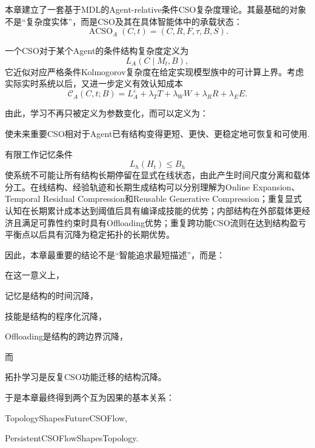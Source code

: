 本章建立了一套基于MDL的Agent-relative条件CSO复杂度理论。其最基础的对象不是“复杂度实体”，而是CSO及其在具体智能体中的承载状态：
\[
\operatorname{ACSO}_{A}(C,t)
=
(C,R,F,\tau,B,S).
\]

一个CSO对于某个Agent的条件结构复杂度定义为
\[
L_A(C\mid M_t,B),
\]
它近似对应严格条件Kolmogorov复杂度在给定实现模型族中的可计算上界。考虑实际实时系统以后，又进一步定义有效认知成本
\[
\mathscr C_A(C,t;B)
=
L_A^\varepsilon
+
\lambda_TT
+
\lambda_WW
+
\lambda_RR
+
\lambda_EE.
\]

由此，学习不再只被定义为参数变化，而可以定义为：
\begin{statementbox}
使未来重要CSO相对于Agent已有结构变得更短、更快、更稳定地可恢复和可使用.
\end{statementbox}

有限工作记忆条件
\[
L_h(H_t)\leq B_h
\]
使系统不可能让所有结构长期停留在显式在线状态，由此产生时间尺度分离和载体分工。在线结构、经验轨迹和长期生成结构可以分别理解为Online Expansion、Temporal Residual Compression和Reusable Generative Compression；重复显式认知在长期累计成本达到阈值后具有编译成技能的优势；内部结构在外部载体更经济且满足可靠性约束时具有Offloading优势；重复跨功能CSO流则在达到结构盈亏平衡点以后具有沉降为稳定拓扑的长期优势。

因此，本章最重要的结论不是“智能追求最短描述”，而是：

\begin{statementbox}
\centering
{}
\end{statementbox}

在这一意义上，
\begin{statementbox}
记忆是结构的时间沉降，
\end{statementbox}
\begin{statementbox}
技能是结构的程序化沉降，
\end{statementbox}
\begin{statementbox}
Offloading是结构的跨边界沉降，
\end{statementbox}
而
\begin{statementbox}
拓扑学习是反复CSO功能迁移的结构沉降。
\end{statementbox}

于是本章最终得到两个互为因果的基本关系：
\begin{statementbox}
TopologyShapesFutureCSOFlow,
\end{statementbox}
\begin{statementbox}
PersistentCSOFlowShapesTopology.
\end{statementbox}

